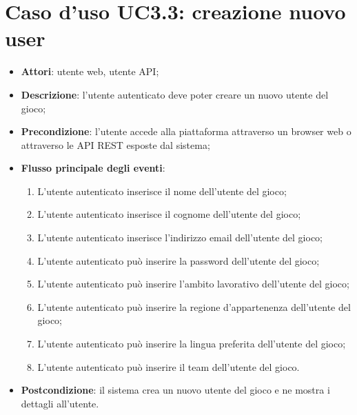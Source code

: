 \section{Caso d'uso UC3.3: creazione nuovo user}
\begin{itemize}
\item \textbf{Attori}: utente web, utente API;
\item \textbf{Descrizione}: l'utente autenticato deve poter creare un nuovo utente del gioco; 
      \item \textbf{Precondizione}: l'utente accede alla piattaforma attraverso un browser web o attraverso le API REST esposte dal sistema;

        \item \textbf{Flusso principale degli eventi}:
          \begin{enumerate}
          \item L'utente autenticato inserisce il nome dell'utente del gioco;
          \item L'utente autenticato inserisce il cognome dell'utente del gioco;
          \item L'utente autenticato inserisce l'indirizzo email dell'utente del gioco;
          \item L'utente autenticato può inserire la password dell'utente del gioco;
          \item L'utente autenticato può inserire l'ambito lavorativo dell'utente del gioco;
          \item L'utente autenticato può inserire la regione d'appartenenza dell'utente del gioco;
          \item L'utente autenticato può inserire la lingua preferita dell'utente del gioco;
          \item L'utente autenticato può inserire il team dell'utente del gioco.

      \end{enumerate}
    \item \textbf{Postcondizione}: il sistema crea un nuovo utente del gioco e ne mostra i dettagli all'utente.
  \end{itemize}
	
\hypertarget{UC3.4}{}
